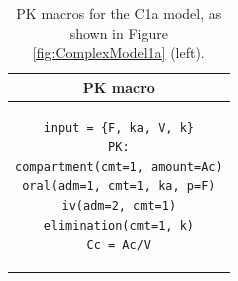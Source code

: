 \begin{table}[h!]
\setlength{\tabcolsep}{15pt}
\begin{center}
\begin{tabular}{c}
  \hline \hline
PK macro  \\[-.25ex]
  \hline
\lstset{language=NONMEMdataSet}
\begin{lstlisting}
input = {F, ka, V, k}
PK:
compartment(cmt=1, amount=Ac)
oral(adm=1, cmt=1, ka, p=F)
iv(adm=2, cmt=1)
elimination(cmt=1, k)
Cc = Ac/V
\end{lstlisting}
\\
  \hline
\end{tabular}
\caption{PK macros for the C1a model, as shown in Figure \ref{fig:ComplexModel1a} (left).}
\label{tab:C1aMacrosTable}
\end{center}
\end{table}

